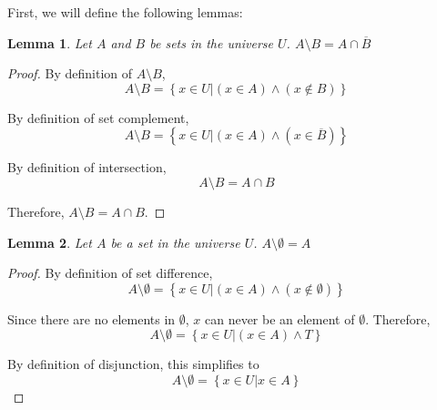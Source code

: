 \documentclass{article}
\newtheorem{lemma}{Lemma}
\begin{document}
\begin{outline}[enumerate]
    First, we will define the following lemmas:

    \begin{lemma}
        Let $A$ and $B$ be sets in the universe $U$. $A \setminus B = A \cap \overline{B}$
        \label{lem:interminus}
    \end{lemma}

    \begin{proof}
        By definition of $A \setminus B$,
        \begin{equation}
            A \setminus B = \left\{ x \in U | (x \in A) \wedge (x \notin B)\right\}
        \end{equation}

        By definition of set complement, 
        \begin{equation}
            A \setminus B = \left\{ x \in U | (x \in A) \wedge (x \in \overline{B})\right\}
        \end{equation}

        By definition of intersection, 
        \begin{equation}
            A \setminus B = A \cap B
        \end{equation}

        Therefore, $A \setminus B = A \cap B$.
    \end{proof}

    \begin{lemma}
        Let $A$ be a set in the universe $U$. $A \setminus \emptyset = A$
        \label{lem:minusempty}
    \end{lemma}
    \begin{proof}
        By definition of set difference, 
        \begin{equation}
            A \setminus \emptyset = \left\{x \in U | (x \in A) \wedge (x \notin \emptyset) \right\}
        \end{equation}

        Since there are no elements in $\emptyset$, $x$ can never be an element of $\emptyset$. Therefore, 
        \begin{equation}
            A \setminus \emptyset = \left\{x \in U | (x \in A) \wedge T \right\}
        \end{equation}

        By definition of disjunction, this simplifies to 
        \begin{equation}
            A \setminus \emptyset = \left\{x \in U | x \in A\right\}
        \end{equation}


\end{proof}
\end{outline}
\end{document}
